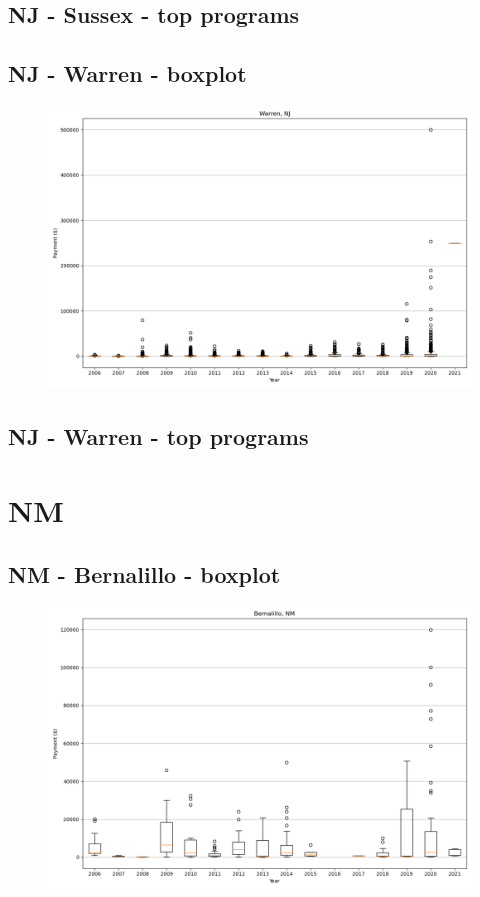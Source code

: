 \subsection*{NJ - Sussex - top programs}

\newpage
\subsection*{NJ - Warren - boxplot}
\begin{figure}[h]
\centering
\includegraphics[width=7in]{../output/boxplots/counties/Warren-NJ_boxplot.png}
\end{figure}


\subsection*{NJ - Warren - top programs}

\newpage
\section*{NM}
\subsection*{NM - Bernalillo - boxplot}
\begin{figure}[h]
\centering
\includegraphics[width=7in]{../output/boxplots/counties/Bernalillo-NM_boxplot.png}
\end{figure}


